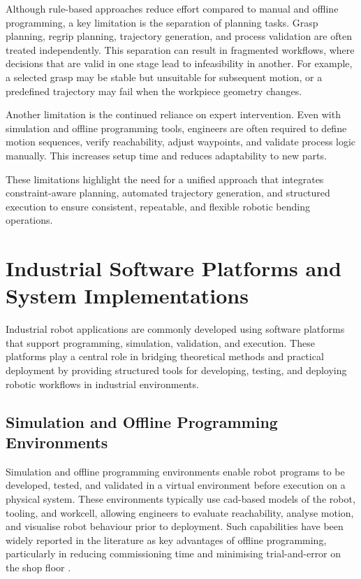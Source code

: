Although rule-based approaches reduce effort compared to manual and offline programming, a key limitation is the separation of planning tasks. Grasp planning, regrip planning, trajectory generation, and process validation are often treated independently. This separation can result in fragmented workflows, where decisions that are valid in one stage lead to infeasibility in another. For example, a selected grasp may be stable but unsuitable for subsequent motion, or a predefined trajectory may fail when the workpiece geometry changes.

Another limitation is the continued reliance on expert intervention. Even with simulation and offline programming tools, engineers are often required to define motion sequences, verify reachability, adjust waypoints, and validate process logic manually. This increases setup time and reduces adaptability to new parts.

These limitations highlight the need for a unified approach that integrates constraint-aware planning, automated trajectory generation, and structured execution to ensure consistent, repeatable, and flexible robotic bending operations.

\section{Industrial Software Platforms and System Implementations}
\label{sec:industrial-software-platforms-system-implementations}

Industrial robot applications are commonly developed using software platforms that support programming, simulation, validation, and execution. These platforms play a central role in bridging theoretical methods and practical deployment by providing structured tools for developing, testing, and deploying robotic workflows in industrial environments.

\subsection{Simulation and Offline Programming Environments}
\label{subsec:simulation-offline-programming-environments}

Simulation and offline programming environments enable robot programs to be developed, tested, and validated in a virtual environment before execution on a physical system. These environments typically use \acs{cad}-based models of the robot, tooling, and workcell, allowing engineers to evaluate reachability, analyse motion, and visualise robot behaviour prior to deployment. Such capabilities have been widely reported in the literature as key advantages of offline programming, particularly in reducing commissioning time and minimising trial-and-error on the shop floor \cite{Pan2012Survey}.

